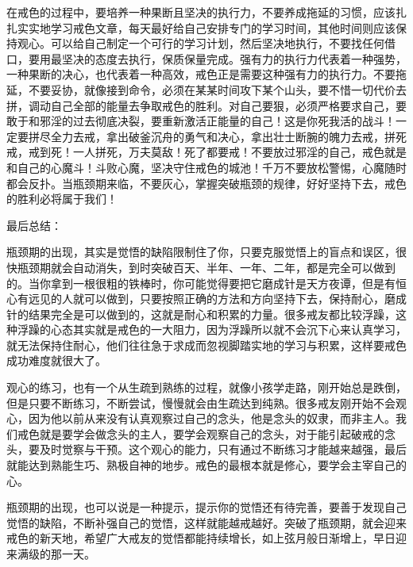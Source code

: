 在戒色的过程中，要培养一种果断且坚决的执行力，不要养成拖延的习惯，应该扎扎实实地学习戒色文章，每天最好给自己安排专门的学习时间，其他时间则应该保持观心。可以给自己制定一个可行的学习计划，然后坚决地执行，不要找任何借口，要用最坚决的态度去执行，保质保量完成。强有力的执行力代表着一种强势，一种果断的决心，也代表着一种高效，戒色正是需要这种强有力的执行力。不要拖延，不要妥协，就像接到命令，必须在某某时间攻下某个山头，要不惜一切代价去拼，调动自己全部的能量去争取戒色的胜利。对自己要狠，必须严格要求自己，要敢于和邪淫的过去彻底决裂，要重新激活正能量的自己！这是你死我活的战斗！一定要拼尽全力去戒，拿出破釜沉舟的勇气和决心，拿出壮士断腕的魄力去戒，拼死戒，戒到死！一人拼死，万夫莫敌！死了都要戒！不要放过邪淫的自己，戒色就是和自己的心魔斗！斗败心魔，坚决守住戒色的城池！千万不要放松警惕，心魔随时都会反扑。当瓶颈期来临，不要灰心，掌握突破瓶颈的规律，好好坚持下去，戒色的胜利必将属于我们！

最后总结：

瓶颈期的出现，其实是觉悟的缺陷限制住了你，只要克服觉悟上的盲点和误区，很快瓶颈期就会自动消失，到时突破百天、半年、一年、二年，都是完全可以做到的。当你拿到一根很粗的铁棒时，你可能觉得要把它磨成针是天方夜谭，但是有恒心有远见的人就可以做到，只要按照正确的方法和方向坚持下去，保持耐心，磨成针的结果完全是可以做到的，这就是耐心和积累的力量。很多戒友都比较浮躁，这种浮躁的心态其实就是戒色的一大阻力，因为浮躁所以就不会沉下心来认真学习，就无法保持住耐心，他们往往急于求成而忽视脚踏实地的学习与积累，这样要戒色成功难度就很大了。

观心的练习，也有一个从生疏到熟练的过程，就像小孩学走路，刚开始总是跌倒，但是只要不断练习，不断尝试，慢慢就会由生疏达到纯熟。很多戒友刚开始不会观心，因为他以前从来没有认真观察过自己的念头，他是念头的奴隶，而非主人。我们戒色就是要学会做念头的主人，要学会观察自己的念头，对于能引起破戒的念头，要及时觉察与干预。这个观心的能力，只有通过不断练习才能越来越强，最后就能达到熟能生巧、熟极自神的地步。戒色的最根本就是修心，要学会主宰自己的心。

瓶颈期的出现，也可以说是一种提示，提示你的觉悟还有待完善，要善于发现自己觉悟的缺陷，不断补强自己的觉悟，这样就能越戒越好。突破了瓶颈期，就会迎来戒色的新天地，希望广大戒友的觉悟都能持续增长，如上弦月般日渐增上，早日迎来满级的那一天。
